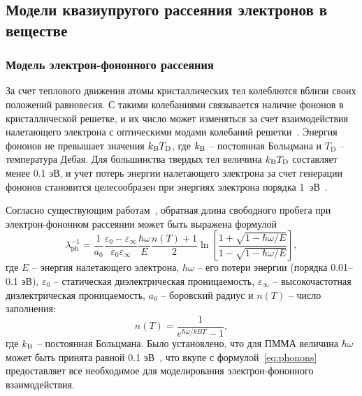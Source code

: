 \subsection{Модели квазиупругого рассеяния электронов в веществе}
\subsubsection{Модель электрон-фононного рассеяния}
За счет теплового движения атомы кристаллических тел колеблются вблизи своих положений равновесия. С такими колебаниями связывается наличие фононов в кристаллической решетке, и их число может изменяться за счет взаимодействия налетающего электрона с оптическими модами колебаний решетки~\cite{Fronlich_phonons, Llacer_phonons}. Энергия фононов не превышает значения $k_\mathrm{B} T_\mathrm{D}$, где $k_\mathrm{B}$ -- постоянная Больцмана и $T_\mathrm{D}$ -- температура Дебая. Для большинства твердых тел величина $k_\mathrm{B} T_\mathrm{D}$ составляет менее 0.1 эВ, и учет потерь энергии налетающего электрона за счет генерации фононов становится целесообразен при энергиях электрона порядка 1~эВ~\cite{Ganachaud_phonons_polarons}.

Согласно существующим работам~\cite{Fronlich_phonons, Llacer_phonons}, обратная длина свободного пробега при электрон-фононном рассеянии может быть выражена формулой
\begin{equation} \label{eq:phonons}
	\lambda_{\mathrm{ph}}^{-1}=\frac{1}{a_0} \frac{\varepsilon_0-\varepsilon_{\infty}}{\varepsilon_0 \varepsilon_{\infty}} \frac{\hbar \omega}{E} \frac{n(T)+1}{2} \ln \left[\frac{1+\sqrt{1-\hbar \omega / E}}{1-\sqrt{1-\hbar \omega / E}}\right],
\end{equation}
где $E$ -- энергия налетающего электрона, $\hbar \omega$ -- его потери энергии (порядка 0.01–0.1 эВ), $\varepsilon_0$ -- статическая диэлектрическая проницаемость, $\varepsilon_\infty$ -- высокочастотная диэлектрическая проницаемость, $a_0$ -- боровский радиус и $n(T)$ -- число заполнения:
\begin{equation}
	n(T)=\frac{1}{e^{\hbar \omega / kB T}-1},
\end{equation}
где $k_\mathrm{B}$ -- постоянная Больцмана. Было установлено, что для ПММА величина $\hbar \omega$ может быть принята равной 0.1 эВ~\cite{Fronlich_phonons, Llacer_phonons}, что вкупе с формулой~\ref{eq:phonons} предоставляет все необходимое для моделирования электрон-фононного взаимодействия.


